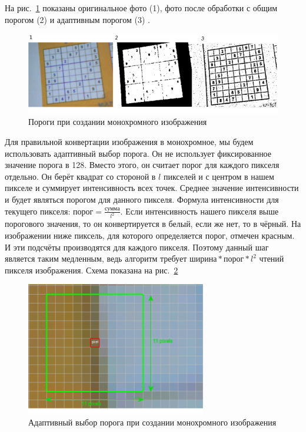 На рис.~\ref{fig:fig21} показаны оригинальное фото (1), фото после обработки с общим порогом (2) и адаптивным порогом (3) .

\begin{figure}[ht!]
  \centering
  \includegraphics[width=\textwidth]{inc/raster/design2-1.png}
  \caption{Пороги при создании монохромного изображения}
  \label{fig:fig21}
\end{figure}

Для правильной конвертации изображения в монохромное, мы будем использовать адаптивный выбор порога. Он не использует фиксированное значение порога в 128. Вместо этого, он считает порог для каждого пикселя отдельно. Он берёт квадрат со стороной в ${l}$ пикселей и с центром в нашем пикселе и суммирует интенсивность всех точек. Среднее значение интенсивности и будет являться порогом для данного пикселя. Формула интенсивности для текущего пикселя: $\text{порог}=\frac{\text{сумма}}{l^2}$. Если интенсивность нашего пикселя выше порогового значения, то он конвертируется в белый, если же нет, то в чёрный. На изображении ниже пиксель, для которого определяется порог, отмечен красным. И эти подсчёты производятся для каждого пикселя. Поэтому данный шаг является таким медленным, ведь алгоритм требует $\text{ширина} * \text{порог} *{l^2}$ чтений пикселя изображения. Схема показана на рис.~\ref{fig:fig22}

\begin{figure}[ht!]
  \centering
  \includegraphics[width=0.7\textwidth]{inc/raster/design2-2.png}
  \caption{Адаптивный выбор порога при создании монохромного изображения}
  \label{fig:fig22}
\end{figure}

